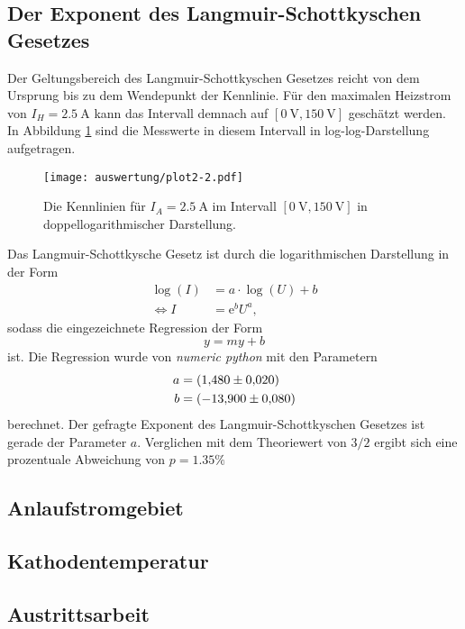 \subsection{Der Exponent des Langmuir-Schottkyschen Gesetzes}
\label{sec:langschott}
Der Geltungsbereich des Langmuir-Schottkyschen Gesetzes reicht von dem Ursprung bis zu dem Wendepunkt der Kennlinie. Für den maximalen Heizstrom
von $I_H=\SI{2.5}{\ampere}$ kann das Intervall demnach auf $[\SI{0}{\volt}, \SI{150}{\volt}]$ geschätzt werden. In Abbildung \ref{fig:plot2} sind 
die Messwerte in diesem Intervall in log-log-Darstellung aufgetragen. 
\begin{figure}[H]
    \centering
    \texttt{[image: auswertung/plot2-2.pdf]}
    \caption{Die Kennlinien für $I_A=\SI{2.5}{\ampere}$ im Intervall $[\SI{0}{\volt}, \SI{150}{\volt}]$ in doppellogarithmischer Darstellung.}
    \label{fig:plot2}
\end{figure}
Das Langmuir-Schottkysche Gesetz ist durch die logarithmischen Darstellung in der Form 
\begin{align*}
    \log(I)&=a\cdot \log(U)+b\\
    \Leftrightarrow
    I&=\text{e}^bU^{a},  
\end{align*}
sodass die eingezeichnete Regression der Form 
\begin{equation}
    y=my+b
    \label{eqn:gerade}
\end{equation}
ist. Die Regression wurde von \textit{numeric python} \cite{scipy} mit den Parametern
\begin{align*}
    a &= \SI{1.48   \pm 0.020}{} \\
    b &= \SI{-13.90 \pm 0.080}{} %
\end{align*}
berechnet.
Der gefragte Exponent des Langmuir-Schottkyschen Gesetzes ist gerade der Parameter $a$. Verglichen mit dem Theoriewert von $3/2$ ergibt sich eine 
prozentuale Abweichung von $p=\num{1.35}\%$
\subsection{Anlaufstromgebiet}
\label{sec:anlauf}

\subsection{Kathodentemperatur}
\label{sec:temp}
\subsection{Austrittsarbeit}   
\label{sec:phi}
